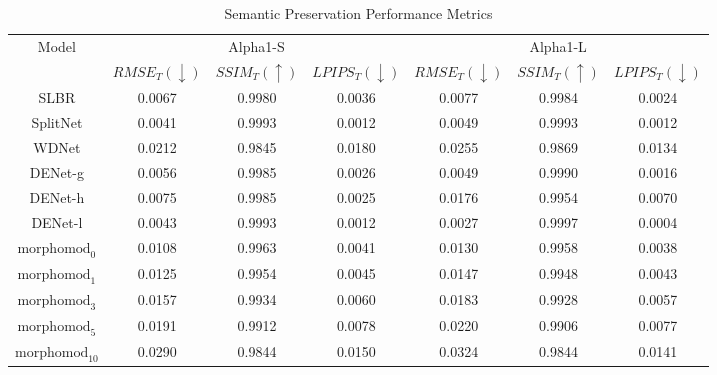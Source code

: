 \begin{table*}[t]
\caption{Semantic Preservation Performance Metrics}
\label{tab:alpha_expr_t}
\begin{center}
\begin{small}
\begin{sc}
\begin{tabular}{cccc|ccc}
\toprule
 \multirow{2}{*}{Model} &  \multicolumn{3}{c|}{Alpha1-S} & \multicolumn{3}{c}{Alpha1-L} \\ 
 & $RMSE_T (\downarrow)$ & $SSIM_T (\uparrow)$ & $LPIPS_T (\downarrow)$ & $RMSE_T (\downarrow)$ & $SSIM_T (\uparrow)$ & $LPIPS_T (\downarrow)$ \\
\midrule
SLBR  & 0.0067 & 0.9980 & 0.0036  & 0.0077 & 0.9984 & 0.0024  \\ 
SplitNet  & 0.0041 & 0.9993 & 0.0012  & 0.0049 & 0.9993 & 0.0012  \\ 
WDNet  & 0.0212 & 0.9845 & 0.0180  & 0.0255 & 0.9869 & 0.0134  \\ 
DENet-g  & 0.0056 & 0.9985 & 0.0026  & 0.0049 & 0.9990 & 0.0016  \\ 
DENet-h  & 0.0075 & 0.9985 & 0.0025  & 0.0176 & 0.9954 & 0.0070  \\ 
DENet-l  & 0.0043 & 0.9993 & 0.0012  & 0.0027 & 0.9997 & 0.0004  \\ 
$\text{morphomod}_0$  & 0.0108 & 0.9963 & 0.0041  & 0.0130 & 0.9958 & 0.0038  \\ 
$\text{morphomod}_1$  & 0.0125 & 0.9954 & 0.0045  & 0.0147 & 0.9948 & 0.0043  \\ 
$\text{morphomod}_3$ & 0.0157 & 0.9934 & 0.0060  & 0.0183 & 0.9928 & 0.0057  \\ 
$\text{morphomod}_5$  & 0.0191 & 0.9912 & 0.0078  & 0.0220 & 0.9906 & 0.0077  \\ 
$\text{morphomod}_10$  & 0.0290 & 0.9844 & 0.0150  & 0.0324 & 0.9844 & 0.0141  \\ 
\bottomrule
\end{tabular}
\end{sc}
\end{small}
\end{center}
\end{table*} 